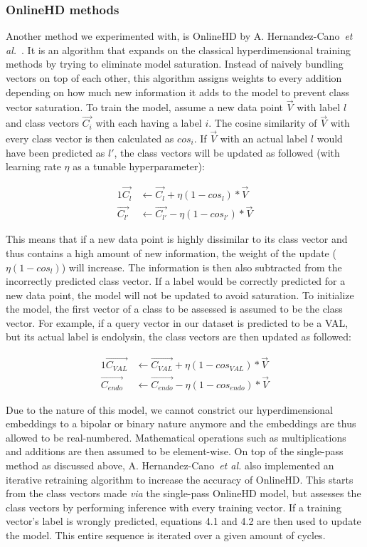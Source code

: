 \subsubsection*{OnlineHD methods}
Another method we experimented with, is OnlineHD by A. Hernandez-Cano~\textit{et al.}~\cite{onlinehd}. It is an algorithm that expands on the classical hyperdimensional training methods by trying to eliminate model saturation. Instead of naively bundling vectors on top of each other, this algorithm assigns weights to every addition depending on how much new information it adds to the model to prevent class vector saturation. To train the model, assume a new data point $\vec{V}$ with label $l$ and class vectors $\vec{C_{i}}$ with each having a label $i$. The cosine similarity of $\vec{V}$ with every class vector is then calculated as $cos_{i}$. If $\vec{V}$ with an actual label $l$ would have been predicted as $l'$, the class vectors will be updated as followed (with learning rate $\eta$ as a tunable hyperparameter):

\begin{alignat}{1}
    \label{eqn:onlinehd}
    \vec{C_{l}} &\leftarrow \vec{C_{l}} + \eta (1 - cos_{l}) * \vec{V} \\
    \vec{C_{l'}} &\leftarrow \vec{C_{l'}} - \eta (1 - cos_{l'}) * \vec{V}
\end{alignat}

This means that if a new data point is highly dissimilar to its class vector and thus contains a high amount of new information, the weight of the update ($\eta (1 - cos_{l})$) will increase. The information is then also subtracted from the incorrectly predicted class vector. If a label would be correctly predicted for a new data point, the model will not be updated to avoid saturation. To initialize the model, the first vector of a class to be assessed is assumed to be the class vector. For example, if a query vector in our dataset is predicted to be a VAL, but its actual label is endolysin, the class vectors are then updated as followed:

\begin{alignat}{1}
    \label{eqn:onlinehd2}
    \vec{C_{VAL}} &\leftarrow \vec{C_{VAL}} + \eta (1 - cos_{VAL}) * \vec{V} \\
    \vec{C_{endo}} &\leftarrow \vec{C_{endo}} - \eta (1 - cos_{endo}) * \vec{V}
\end{alignat}

Due to the nature of this model, we cannot constrict our hyperdimensional embeddings to a bipolar or binary nature anymore and the embeddings are thus allowed to be real-numbered. Mathematical operations such as multiplications and additions are then assumed to be element-wise. On top of the single-pass method as discussed above, A. Hernandez-Cano~\textit{et al.} also implemented an iterative retraining algorithm to increase the accuracy of OnlineHD. This starts from the class vectors made \textit{via} the single-pass OnlineHD model, but assesses the class vectors by performing inference with every training vector. If a training vector's label is wrongly predicted, equations 4.1 and 4.2 are then used to update the model. This entire sequence is iterated over a given amount of cycles.

